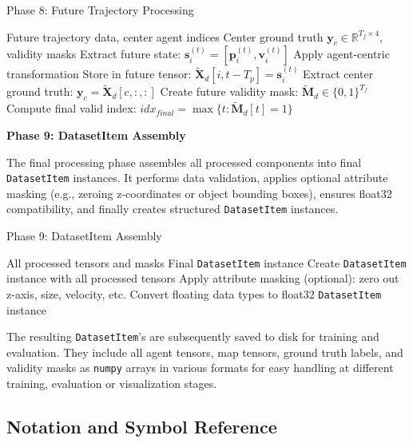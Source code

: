 \begin{algorithm}[H]
\caption{Phase 8: Future Trajectory Processing}
\label{alg:phase8_future}
\begin{algorithmic}[1]
\REQUIRE Future trajectory data, center agent indices
\ENSURE Center ground truth \(\boldsymbol{y}_c \in \mathbb{R}^{T_f \times 4}\), validity masks
\FOR{each agent \(i\), future timestep \(t \in [T_p, T_p + T_f)\)}
    \STATE Extract future state: \(\boldsymbol{s}_i^{(t)} = [\boldsymbol{p}_i^{(t)}, \boldsymbol{v}_i^{(t)}]\)
    \STATE Apply agent-centric transformation
    \STATE Store in future tensor: \(\tilde{\boldsymbol{X}}_d[i, t-T_p] = \boldsymbol{s}_i^{(t)}\)
\ENDFOR
{}
    \STATE Extract center ground truth: \(\boldsymbol{y}_c = \tilde{\boldsymbol{X}}_d[c, :, :]\)
    \STATE Create future validity mask: \(\tilde{\boldsymbol{M}}_d \in \{0,1\}^{T_f}\)
    \STATE Compute final valid index: \(idx_{final} = \max\{t : \tilde{\boldsymbol{M}}_d[t] = 1\}\)
\ENDFOR
\end{algorithmic}
\end{algorithm}

\textbf{Phase 9: DatasetItem Assembly}

The final processing phase assembles all processed components into final \texttt{DatasetItem} instances. It performs data validation, applies optional attribute masking (e.g., zeroing z-coordinates or object bounding boxes), ensures float32 compatibility, and finally creates structured \texttt{DatasetItem} instances.
\begin{algorithm}[H]
\caption{Phase 9: DatasetItem Assembly}
\label{alg:phase9_assembly}
\begin{algorithmic}[1]
\REQUIRE All processed tensors and masks
\ENSURE Final \texttt{DatasetItem} instance
\STATE Create \texttt{DatasetItem} instance with all processed tensors
\STATE Apply attribute masking (optional): zero out z-axis, size, velocity, etc.
\STATE Convert floating data types to float32
\RETURN \texttt{DatasetItem} instance
\end{algorithmic}
\end{algorithm}

The resulting \texttt{DatasetItem}'s are subsequently saved to disk for training and evaluation. They include all agent tensors, map tensors, ground truth labels, and validity masks as \texttt{numpy} arrays in various formats for easy handling at different training, evaluation or visualization stages.

\subsection{Notation and Symbol Reference}
\label{app:notation}

